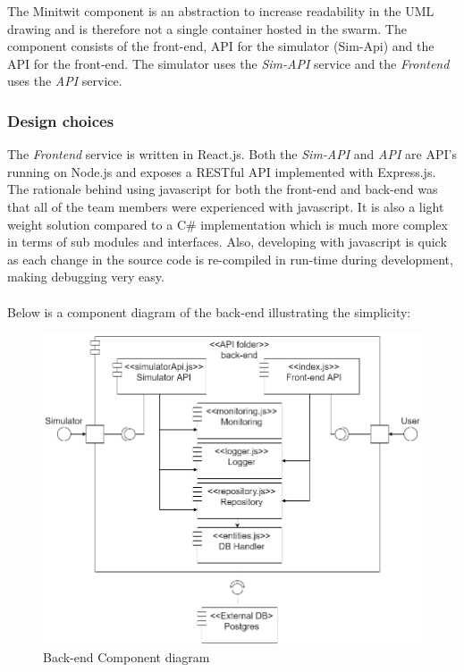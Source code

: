 The Minitwit component is an abstraction to increase readability in the UML drawing and is therefore not a single container hosted in the swarm. The component consists of the front-end, API for the simulator (Sim-Api) and the API for the front-end. The simulator uses the \textit{Sim-API} service and the \textit{Frontend} uses the \textit{API} service.

\subsubsection{Design choices}



The \textit{Frontend} service is written in React.js. Both the \textit{Sim-API} and \textit{API} are API's running on Node.js and exposes a RESTful API implemented with Express.js. \\
The rationale behind using javascript for both the front-end and back-end was that all of the team members were experienced with javascript. It is also a light weight solution compared to a C\# implementation which is much more complex in terms of sub modules and interfaces. Also, developing with javascript is quick as each change in the source code is re-compiled in run-time during development, making debugging very easy.\\
\\
Below is a component diagram of the back-end illustrating the simplicity:

\begin{figure}[h!]
    \centering
    \includegraphics[width=1\linewidth]{report/images/component-diagram.png}
    \caption{Back-end Component diagram}
    \label{fig:back-end-component-diagram}
\end{figure}

